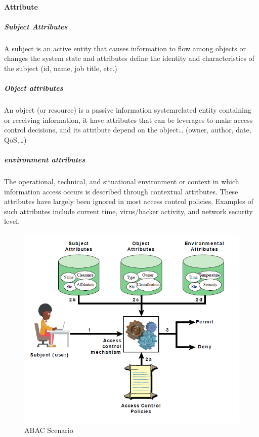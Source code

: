 \documentclass{article}
\begin{document}
            \paragraph{Attribute}
                \subparagraph{Subject Attributes}
                A subject is an active
                entity that causes
                information to flow
                among objects or
                changes the system
                state
                and attributes define the
                identity and
                characteristics of the
                subject (id, name, job
                title, etc.)
                \subparagraph{Object attributes}
                An object (or
                resource) is a passive
                information systemrelated
                entity
                containing or
                receiving information, it have
                attributes that can be
                leverages to make
                access control
                decisions, and its attribute depend on
                the object… (owner,
                author, date, QoS,…)
                \subparagraph{environment attributes}
                The operational, technical, and situational environment or context in which information access occurs is described through contextual attributes. These attributes have largely been ignored in most access control policies. Examples of such attributes include current time, virus/hacker activity, and network security level.


                \begin{figure}[h]
                    \begin{center}
                        \includegraphics[scale=0.6]{../immagini/ABACscenario.png}
                    \end{center}
                    \caption{ABAC Scenario}
                \end{figure}
    
\end{document}
